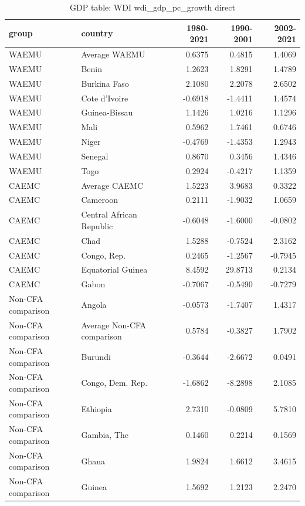 \begin{table}

\caption{GDP table: WDI wdi_gdp_pc_growth direct}
\centering
\begin{tabular}[t]{llrrr}
\toprule
group & country & 1980-2021 & 1990-2001 & 2002-2021\\
\midrule
WAEMU & Average WAEMU & 0.6375 & 0.4815 & 1.4069\\
WAEMU & Benin & 1.2623 & 1.8291 & 1.4789\\
WAEMU & Burkina Faso & 2.1080 & 2.2078 & 2.6502\\
WAEMU & Cote d'Ivoire & -0.6918 & -1.4411 & 1.4574\\
WAEMU & Guinea-Bissau & 1.1426 & 1.0216 & 1.1296\\
\addlinespace
WAEMU & Mali & 0.5962 & 1.7461 & 0.6746\\
WAEMU & Niger & -0.4769 & -1.4353 & 1.2943\\
WAEMU & Senegal & 0.8670 & 0.3456 & 1.4346\\
WAEMU & Togo & 0.2924 & -0.4217 & 1.1359\\
CAEMC & Average CAEMC & 1.5223 & 3.9683 & 0.3322\\
\addlinespace
CAEMC & Cameroon & 0.2111 & -1.9032 & 1.0659\\
CAEMC & Central African Republic & -0.6048 & -1.6000 & -0.0802\\
CAEMC & Chad & 1.5288 & -0.7524 & 2.3162\\
CAEMC & Congo, Rep. & 0.2465 & -1.2567 & -0.7945\\
CAEMC & Equatorial Guinea & 8.4592 & 29.8713 & 0.2134\\
\addlinespace
CAEMC & Gabon & -0.7067 & -0.5490 & -0.7279\\
Non-CFA comparison & Angola & -0.0573 & -1.7407 & 1.4317\\
Non-CFA comparison & Average Non-CFA comparison & 0.5784 & -0.3827 & 1.7902\\
Non-CFA comparison & Burundi & -0.3644 & -2.6672 & 0.0491\\
Non-CFA comparison & Congo, Dem. Rep. & -1.6862 & -8.2898 & 2.1085\\
\addlinespace
Non-CFA comparison & Ethiopia & 2.7310 & -0.0809 & 5.7810\\
Non-CFA comparison & Gambia, The & 0.1460 & 0.2214 & 0.1569\\
Non-CFA comparison & Ghana & 1.9824 & 1.6612 & 3.4615\\
Non-CFA comparison & Guinea & 1.5692 & 1.2123 & 2.2470\\

\end{tabular}
\end{table}
